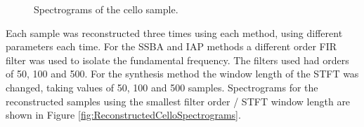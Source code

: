 	\begin{figure}[h!]
		\centering
		\qquad
		\caption{Spectrograms of the cello sample.}
		\label{fig:CelloSpectrograms}
	\end{figure}

	Each sample was reconstructed three times using each method, using different parameters each time. For the SSBA and
	IAP methods a different order FIR filter was used to isolate the fundamental frequency. The filters used had orders
	of 50, 100 and 500. For the synthesis method the window length of the STFT was changed, taking values of 50, 100 and
	500 samples. Spectrograms for the reconstructed samples using the smallest filter order / STFT window length are
	shown in Figure \ref{fig:ReconstructedCelloSpectrograms}.

